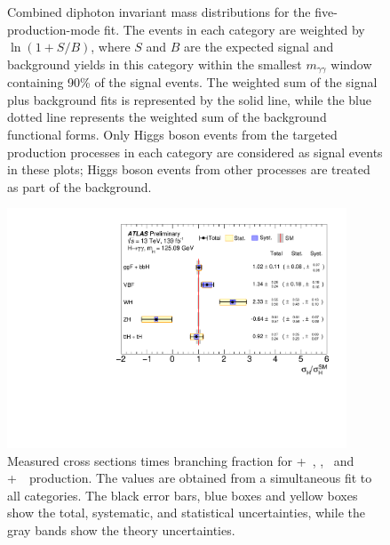 \begin{figure}[tpb!]
\caption{Combined diphoton invariant mass distributions for the five-production-mode fit. The events in each category are weighted by $\ln(1+S/B)$, where $S$ and $B$ are the expected signal and background yields in this category within the smallest $m_{\gamma \gamma}$ window containing 90\% of the signal events. The weighted sum of the signal plus background fits is represented by the solid line, while the blue dotted line represents the weighted sum of the background functional forms. Only Higgs boson events from the targeted production processes in each category are considered as signal events in these plots; Higgs boson events from other processes are treated as part of the background.}
\label{fig:results:prodXS_spectra}
\end{figure}

\begin{figure}[h!]
  \centering
  \includegraphics[width=0.9\textwidth]{figures/couplings_chapter/summary_5XS}
  \caption{Measured cross sections times branching fraction for \ggF+~\bbH, \VBF, \VH\ and \ttH+~\tH\ production. The values are obtained from a simultaneous fit to all categories. The black error bars, blue boxes and yellow boxes show the total, systematic, and statistical uncertainties, while the gray bands show the theory uncertainties. }
  \label{fig:results:prodXS}
\end{figure}

